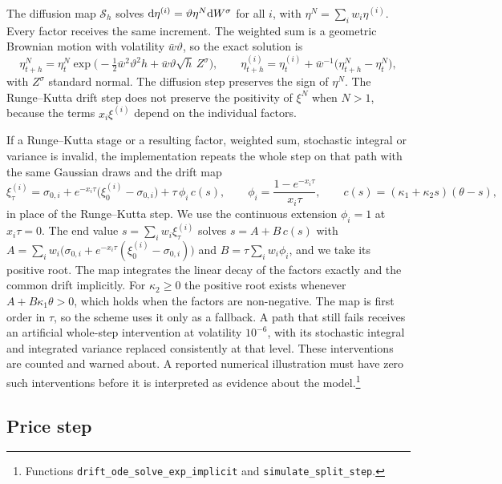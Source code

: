 The diffusion map $\mathcal{S}_h$ solves $\mathrm{d}\eta^{(i)}=\vartheta\eta^N\mathrm{d} W^\sigma$ for all $i$, with $\eta^N=\sum_iw_i\eta^{(i)}$. Every factor receives the same increment. The weighted sum is a geometric Brownian motion with volatility $\bar w\vartheta$, so the exact solution is
\begin{equation}\label{eq:diffusion_step}
\eta^N_{t+h}=\eta^N_t\exp\Big(-\tfrac12\bar w^2\vartheta^2h+\bar w\vartheta\sqrt h\,Z^\sigma\Big),\qquad \eta^{(i)}_{t+h}=\eta^{(i)}_t+\bar w^{-1}\big(\eta^N_{t+h}-\eta^N_t\big),
\end{equation}
with $Z^\sigma$ standard normal. The diffusion step preserves the sign of $\eta^N$. The Runge--Kutta drift step does not preserve the positivity of $\xi^N$ when $N>1$, because the terms $x_i\xi^{(i)}$ depend on the individual factors.

If a Runge--Kutta stage or a resulting factor, weighted sum, stochastic integral or variance is invalid, the implementation repeats the whole step on that path with the same Gaussian draws and the drift map
\begin{equation}\label{eq:drift_ei}
\xi^{(i)}_\tau=\sigma_{0,i}+e^{-x_i\tau}\big(\xi^{(i)}_0-\sigma_{0,i}\big)+\tau\,\phi_i\,c(s),\qquad \phi_i=\frac{1-e^{-x_i\tau}}{x_i\tau},\qquad c(s)=(\kappa_1+\kappa_2s)(\theta-s),
\end{equation}
in place of the Runge--Kutta step. We use the continuous extension $\phi_i=1$ at $x_i\tau=0$. The end value $s=\sum_iw_i\xi^{(i)}_\tau$ solves $s=A+B\,c(s)$ with $A=\sum_iw_i\big(\sigma_{0,i}+e^{-x_i\tau}(\xi^{(i)}_0-\sigma_{0,i})\big)$ and $B=\tau\sum_iw_i\phi_i$, and we take its positive root. The map integrates the linear decay of the factors exactly and the common drift implicitly. For $\kappa_2\ge0$ the positive root exists whenever $A+B\kappa_1\theta>0$, which holds when the factors are non-negative. The map is first order in $\tau$, so the scheme uses it only as a fallback. A path that still fails receives an artificial whole-step intervention at volatility $10^{-6}$, with its stochastic integral and integrated variance replaced consistently at that level. These interventions are counted and warned about. A reported numerical illustration must have zero such interventions before it is interpreted as evidence about the model.\footnote{Functions \texttt{drift\_ode\_solve\_exp\_implicit} and \texttt{simulate\_split\_step}.}

\subsection{Price step}\label{sec:price_step}

